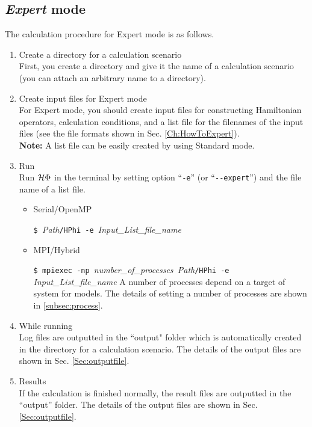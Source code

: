 \subsection{{\it Expert} mode}
The calculation procedure for Expert mode is as follows.
 \begin{enumerate}
   \item Create a directory for a calculation scenario \\
     First, you create a directory and give it the name of a calculation scenario
     (you can attach an arbitrary name to a directory).
   \item Create input files for Expert mode\\
     For Expert mode, you should create input files 
     for constructing Hamiltonian operators, calculation conditions, and 
     a list file for the filenames of the input files
     (see the file formats shown in Sec. \ref{Ch:HowToExpert}). \\
     {\bf Note:} A list file can be easily created by using Standard mode.
 \item  Run\\
   Run $\mathcal{H} \Phi$ in the terminal by setting option ``\verb|-e|''
   (or ``\verb|--expert|'') and the file name of a list file.\\

\begin{itemize}

\item Serial/OpenMP

  \verb|$ |\textit{Path}\verb|/HPhi -e |\textit{Input\_List\_file\_name}
  
\item MPI/Hybrid

  \verb|$ mpiexec -np |\textit{number\_of\_processes}\verb| |\textit{Path}\verb|/HPhi -e |\textit{Input\_List\_file\_name}
 {A number of processes depend on a target of system for models. The details of setting a number of processes are shown in  \ref{subsec:process}.}
\end{itemize}

\item While running\\
  Log files are outputted in the ``output" folder which is automatically created
  in the directory for a calculation scenario.
  The details of the output files are shown in Sec. \ref{Sec:outputfile}.

\item Results\\
  If the calculation is finished normally,
  the result files are outputted in the ``output'' folder.
  The details of the output files are shown in Sec. \ref{Sec:outputfile}.
\end{enumerate}



